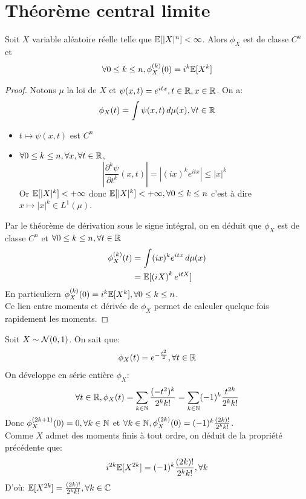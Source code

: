 \documentclass[]{report}
\begin{document}
    \section{Théorème central limite}

    \begin{prop}{}{}
        Soit $X$ variable aléatoire réelle telle que $\mathbb{E}[|X|^n]<\infty$. Alors $\phi_X$ est de classe $C^n$ et
        \[\forall 0\le k\le n,\phi_X^{(k)}(0)=i^{k}\mathbb{E}[X^k]\]
    \end{prop}

    \begin{proof}
        Notons $\mu$ la loi de $X$ et $\psi(x,t)=e^{itx},t\in \mathbb{R},x\in \mathbb{R}$. On a:
        \[\phi_X(t)=\int \psi(x,t)\, d\mu(x),\forall t\in \mathbb{R}\]
        \begin{itemize}
            \item $t\mapsto \psi(x,t)$ est $C^n$
            \item $\forall 0\le k\le n,\forall x, \forall t\in \mathbb{R}$,
            \[\left|\frac{\partial^k \psi}{\partial t^k}(x,t)\right|= \left|\left(ix\right)^k e^{itx}\right|\le \left|x\right|^k\]
            Or $\mathbb{E}[|X|^k]<+\infty$ donc $\mathbb{E}[|X|^k]<+\infty,\forall 0\le k\le n$ c'est à dire $x\mapsto |x|^k\in L^1(\mu)$.
        \end{itemize}
        Par le théorème de dérivation sous le signe intégral, on en déduit que $\phi_X$ est de classe $C^n$ et $\forall 0\le k\le n,\forall t\in \mathbb{R}$
        \begin{align*}
            \phi_X^{(k)}(t)&=\int (ix)^k e^{itx} \,d\mu(x)\\
            &=\mathbb{E}[\left(iX\right)^k e^{itX}]
        \end{align*}
        En particuliern $\phi_X^{(k)}(0)=i^k\mathbb{E}[ X^k],\forall 0\le k\le n$.\\
        Ce lien entre moments et dérivée de $\phi_X$ permet de calculer quelque fois rapidement les moments.
    \end{proof}

    \begin{ex}{}{}
        Soit $X\sim \mathcal{N}(0,1)$. On sait que:
        \[\phi_X(t)=e^{-\frac{t^2}{2}},\forall t\in \mathbb{R}\]
        On développe en série entière $\phi_X$:
        \[\forall t\in \mathbb{R}, \phi_X(t)=\sum_{k\in \mathbb{N}}\frac{(-t^2)^k}{2^{k}k!}=\sum_{k\in \mathbb{N}}(-1)^k\frac{t^{2k}}{2^{k}k!}\]
        Donc $\phi_X^{(2k+1)}(0)=0,\forall k\in \mathbb{N}$ et $\forall k\in \mathbb{N}, \phi_X^{(2k)}(0)=(-1)^k\frac{(2k)!}{2^{k}k!}$.\\
        Comme $X$ admet des moments finis à tout ordre, on déduit de la propriété précédente que:
        \[i^{2k}\mathbb{E}[X^{2k}]=(-1)^k\frac{(2k)!}{2^{k}k!},\forall k\]
        D'où: $\mathbb{E}[X^{2k}]=\frac{(2k)!}{2^k k!},\forall k\in \mathbb{C}$
    \end{ex}
\end{document}
